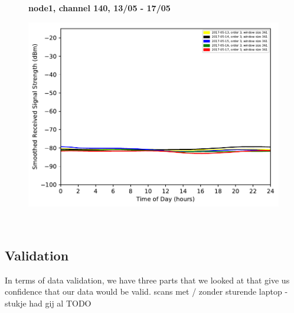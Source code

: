 \begin{figure}[h!]
    \centering
    \textbf{node1, channel 140, 13/05 - 17/05}\par\medskip
	\includegraphics[scale=0.4]{images/5_GHz/node1_2017-05-17_chan140_image.pdf}
\end{figure}\\
\subsection{Validation}
In terms of data validation, we have three parts that we looked at that give us confidence that our data would be valid.
scans met / zonder sturende laptop - stukje had gij al TODO

